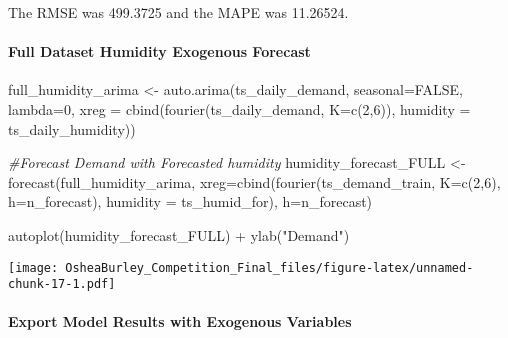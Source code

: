 \documentclass[
]{article}
\newenvironment{Shaded}{\begin{snugshade}}{\end{snugshade}}
\newcommand{\AttributeTok}[1]{\textcolor[rgb]{0.77,0.63,0.00}{#1}}
\newcommand{\CommentTok}[1]{\textcolor[rgb]{0.56,0.35,0.01}{\textit{#1}}}
\newcommand{\ConstantTok}[1]{\textcolor[rgb]{0.00,0.00,0.00}{#1}}
\newcommand{\DecValTok}[1]{\textcolor[rgb]{0.00,0.00,0.81}{#1}}
\newcommand{\FunctionTok}[1]{\textcolor[rgb]{0.00,0.00,0.00}{#1}}
\newcommand{\NormalTok}[1]{#1}
\newcommand{\OtherTok}[1]{\textcolor[rgb]{0.56,0.35,0.01}{#1}}
\newcommand{\SpecialCharTok}[1]{\textcolor[rgb]{0.00,0.00,0.00}{#1}}
\newcommand{\StringTok}[1]{\textcolor[rgb]{0.31,0.60,0.02}{#1}}
\begin{document}
The RMSE was 499.3725 and the MAPE was 11.26524.

\hypertarget{full-dataset-humidity-exogenous-forecast-1}{%
\paragraph{Full Dataset Humidity Exogenous
Forecast}\label{full-dataset-humidity-exogenous-forecast-1}}

\begin{Shaded}
\begin{Highlighting}[]
\NormalTok{full\_humidity\_arima }\OtherTok{\textless{}{-}} \FunctionTok{auto.arima}\NormalTok{(ts\_daily\_demand, }
                             \AttributeTok{seasonal=}\ConstantTok{FALSE}\NormalTok{, }
                             \AttributeTok{lambda=}\DecValTok{0}\NormalTok{,}
         \AttributeTok{xreg =} \FunctionTok{cbind}\NormalTok{(}\FunctionTok{fourier}\NormalTok{(ts\_daily\_demand, }
                                          \AttributeTok{K=}\FunctionTok{c}\NormalTok{(}\DecValTok{2}\NormalTok{,}\DecValTok{6}\NormalTok{)),}
               \AttributeTok{humidity =}\NormalTok{ ts\_daily\_humidity))}

\CommentTok{\#Forecast Demand with Forecasted humidity}
\NormalTok{humidity\_forecast\_FULL }\OtherTok{\textless{}{-}} \FunctionTok{forecast}\NormalTok{(full\_humidity\_arima,}
                           \AttributeTok{xreg=}\FunctionTok{cbind}\NormalTok{(}\FunctionTok{fourier}\NormalTok{(ts\_demand\_train, }
                                          \AttributeTok{K=}\FunctionTok{c}\NormalTok{(}\DecValTok{2}\NormalTok{,}\DecValTok{6}\NormalTok{),}
                                          \AttributeTok{h=}\NormalTok{n\_forecast),}
                                \AttributeTok{humidity =}\NormalTok{ ts\_humid\_for),}
                           \AttributeTok{h=}\NormalTok{n\_forecast) }

\FunctionTok{autoplot}\NormalTok{(humidity\_forecast\_FULL) }\SpecialCharTok{+} \FunctionTok{ylab}\NormalTok{(}\StringTok{"Demand"}\NormalTok{)}
\end{Highlighting}
\end{Shaded}

\texttt{[image: OsheaBurley\_Competition\_Final\_files/figure-latex/unnamed-chunk-17-1.pdf]}

\hypertarget{export-model-results-with-exogenous-variables-1}{%
\paragraph{Export Model Results with Exogenous
Variables}\label{export-model-results-with-exogenous-variables-1}}
\end{document}
